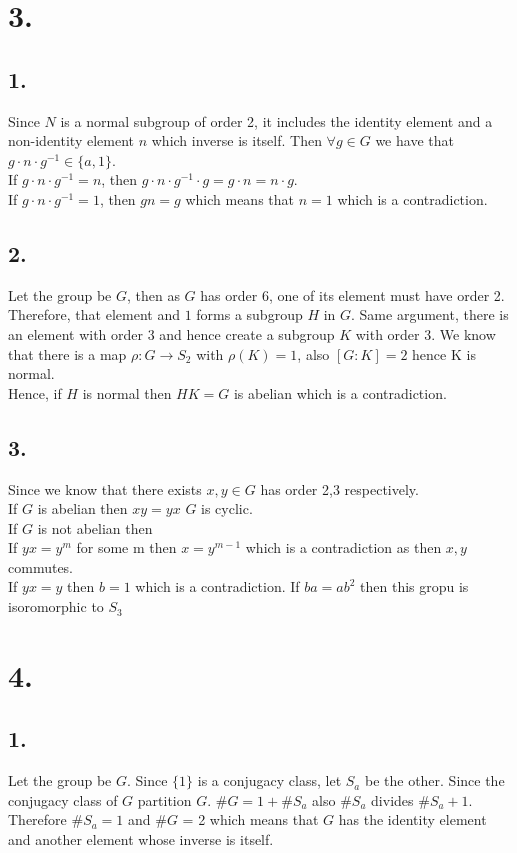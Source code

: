 \documentclass[11pt]{article}
\begin{document}
\section*{3.}
\subsection*{1.}
Since $N$ is a normal subgroup of order 2, it includes the identity element and a non-identity element $n$ which inverse is itself.
Then $\forall g \in G$ we have that $g \cdot n \cdot g^{-1} \in \{a,1\}$. \\
If $g \cdot n \cdot g^{-1} = n$, then $g \cdot n \cdot g^{-1} \cdot g = g \cdot n = n \cdot g$. \\
If $g \cdot n \cdot g^{-1} = 1$, then $gn = g$ which means that $n = 1$ which is a contradiction.
\subsection*{2.}
Let the group be $G$, then as $G$ has order 6, one of its element must have order 2. \\
Therefore, that element and $1$ forms a subgroup $H$ in $G$. 
Same argument, there is an element with order 3 and hence create a subgroup $K$ with order 3.
We know that there is a map $\rho: G \to S_2$ with $\rho(K) = 1$, also $[G:K] = 2$ hence K is normal. \\
Hence, if $H$ is normal then $HK = G$ is abelian which is a contradiction.
\subsection*{3.}
Since we know that there exists $x,y \in G$ has order 2,3 respectively. \\
If $G$ is abelian then $xy = yx$ $G$ is cyclic. \\
If $G$ is not abelian then \\
If $yx = y^m$ for some m then $x = y^{m-1}$ which is a contradiction as then $x,y$ commutes. \\
If $yx = y$ then $b=1$ which is a contradiction.
If $ba = ab^2$ then this gropu is isoromorphic to $S_3$ 
\pagebreak
\section*{4.}
\subsection*{1.}
Let the group be $G$. Since $\{1\}$ is a conjugacy class, let $S_a$ be the other. 
Since the conjugacy class of $G$ partition $G$. $\#G = 1 + \#S_a$ also $\#S_a$ divides $\#S_a +1$.
Therefore $\#S_a = 1$ and $\#G$ = 2 which means that $G$ has the identity element and another element whose inverse is itself.
\end{document}
